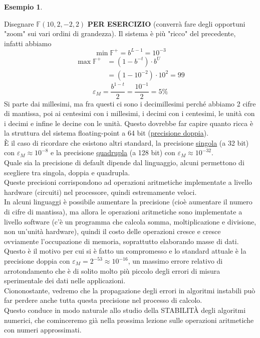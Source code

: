 \documentclass[12pt]{article}
\newtheorem*{esempio}{Esempio}
\begin{document}
\begin{esempio} \end{esempio}
Disegnare $\mathbb{F}(10, 2, -2, 2)$ \textbf{PER ESERCIZIO} (converrà fare degli opportuni "zoom" sui vari ordini di grandezza). Il sistema è più "ricco" del precedente, infatti abbiamo
\[ \min \mathbb{F}^+ = b^{L-1} = 10^{-3} \]
\[\begin{split}
    \max \mathbb{F}^+ & = (1 - b^{-t}) \cdot b^U \\
    & = (1 - 10^{-2}) \cdot 10^2 = 99
\end{split}\]
\[ \varepsilon_M = \frac{b^{1-t}}{2} = \frac{10^{-1}}{2} = 5\% \]
Si parte dai millesimi, ma fra questi ci sono i decimillesimi perché abbiamo 2 cifre di mantissa, poi ai centesimi con i millesimi, i decimi con i centesimi, le unità con i decimi e infine le decine con le unità.
\newline \newline
Questo dovrebbe far capire quanto ricca è la struttura del sistema floating-point a 64 bit (\underline{precisione doppia}). \\
È il caso di ricordare che esistono altri standard, la precisione \underline{singola} (a 32 bit) con $\varepsilon_M \approx 10^{-8}$ e la precisione \underline{quadrupla} (a 128 bit) con $\varepsilon_M \approx 10^{-32}$.\\
Quale sia la precisione di default dipende dal linguaggio, alcuni permettono di scegliere tra singola, doppia e quadrupla. \\
Queste precisioni corrispondono ad operazioni aritmetiche implementate a livello hardware (circuiti) nel processore, quindi estremamente veloci. \\
In alcuni linguaggi è possibile aumentare la precisione (cioè aumentare il numero di cifre di mantissa), ma allora le operazioni aritmetiche sono implementate a livello software (c’è un programma che calcola somma, moltiplicazione e divisione, non un’unità hardware), quindi il costo delle operazioni cresce e cresce ovviamente l’occupazione di memoria, soprattutto elaborando masse di dati. \\
Questo è il motivo per cui si è fatto un compromesso e lo standard attuale è la precisione doppia con $\varepsilon_M = 2^{-53} \approx 10^{-16}$, un massimo errore relativo di arrotondamento che è di solito molto più piccolo degli errori di misura sperimentale dei dati nelle applicazioni.\\
Ciononostante, vedremo che la propagazione degli errori in algoritmi instabili può far perdere anche tutta questa precisione nel processo di calcolo. \\
Questo conduce in modo naturale allo studio della STABILITÀ degli algoritmi numerici, che cominceremo già nella prossima lezione sulle operazioni aritmetiche con numeri approssimati.
\end{document}
